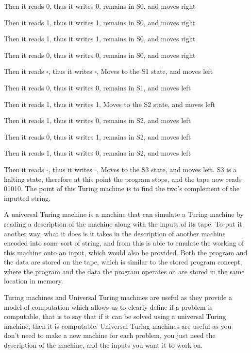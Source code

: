   Then it reads 0, thus it writes 0, remains in S0, and moves right
  
  
  
  Then it reads 1, thus it writes 1, remains in S0, and moves right
  
  
  
  Then it reads 1, thus it writes 1, remains in S0, and moves right
  
  
  
  Then it reads 0, thus it writes 0, remains in S0, and moves right
  
  
  
  Then it reads $\square$, thus it writes $\square$, Moves to the S1 state, and moves left
  
  
  
  Then it reads 0, thus it writes 0, remains in S1, and moves left
  
  
  
  Then it reads 1, thus it writes 1, Moves to the S2 state, and moves left
  
  
  
  Then it reads 1, thus it writes 0, remains in S2, and moves left
  
  
  
  Then it reads 0, thus it writes 1, remains in S2, and moves left
  
  
  
  Then it reads 1, thus it writes 0, remains in S2, and moves left
  
  
  
  Then it reads $\square$, thus it writes $\square$, Moves to the S3 state, and moves left. S3 is a halting state, therefore at this point the program stops, and the tape now reads 01010. The point of this Turing machine is to find the two's complement of the inputted string.
  
  A universal Turing machine is a machine that can simulate a Turing machine by reading a description of the machine along with the inputs of its tape. To put it another way, what it does is it takes in the description of another machine encoded into some sort of string, and from this is able to emulate the working of this machine onto an input, which would also be provided. Both the program and the data are stored on the tape, which is similar to the stored program concept, where the program and the data the program operates on are stored in the same location in memory. 
  
  Turing machines and Universal Turing machines are useful as they provide a model of computation which allows us to clearly define if a problem is computable, that is to say that if it can be solved using a universal Turing machine, then it is computable. Universal Turing machines are useful as you don't need to make a new machine for each problem, you just need the description of the machine, and the inputs you want it to work on.